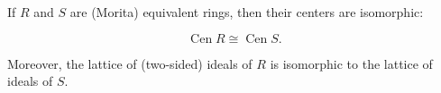 If $R$ and $S$ are (Morita) equivalent rings, then their centers are isomorphic:

$$\operatorname{Cen} R \cong \operatorname{Cen} S.$$

Moreover, the lattice of (two-sided) ideals of $R$ is isomorphic to the lattice of ideals of $S$.
